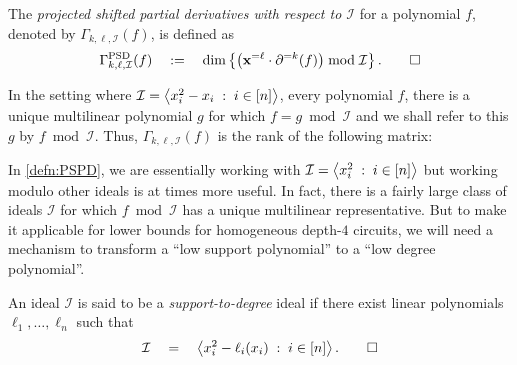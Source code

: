  \begin{definition} \label{defn:PSPD-ideal}
The \emph{projected shifted partial derivatives with respect to $\mathcal{I}$} for a polynomial $f$, denoted by $\Gamma_{k,\ell,\mathcal{I}}(f)$, is defined as 
\[
\Gamma^{\mathrm{PSD}}_{k,\ell,\mathcal{I}}(f) \quad := \quad \dim \left\{\left(\mathbf{x}^{=\ell} \cdot \partial^{=k}(f)\right) \bmod \mathcal{I}\right\}.\qedhere
\]
\end{definition}
\noindent
In the setting where $\mathcal{I} = \left\langle x_i^2 - x_i\;:\; i\in [n]\right\rangle$, every polynomial $f$, there is a unique multilinear polynomial $g$ for which $f = g \bmod \mathcal{I}$ and we shall refer to this $g$ by $f \bmod \mathcal{I}$. Thus, $\Gamma_{k,\ell,\mathcal{I}}(f)$ is the rank of the following matrix:


\noindent In \autoref{defn:PSPD}, we are essentially working with
$\mathcal{I} = \left\langle x_i^2 \;:\; i\in [n]\right\rangle$ but working modulo other ideals is at times more useful.
In fact, there is a fairly large class of ideals $\mathcal{I}$ for which $f \bmod \mathcal{I}$ has a unique multilinear representative. But to make it applicable for lower bounds for homogeneous depth-$4$ circuits, we will need a mechanism to transform a ``low support polynomial'' to a ``low degree polynomial''. 

\begin{definition}\label{defn:supp-to-degree-ideal}
An ideal $\mathcal{I}$ is said to be a \emph{support-to-degree} ideal if there exist linear polynomials $\ell_1, \ldots, \ell_n$ such that
\[
\mathcal{I} \quad = \quad \left\langle x_i^2 - \ell_i(x_i) \;:\; i\in [n]\right\rangle. \qedhere
\]
\end{definition}

